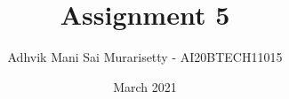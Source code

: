 \documentclass[journal,12pt,twocolumn]{IEEEtran}
\date{March 2021}
\DeclareMathOperator*{\Res}{Res}
\begin{document}
\newcommand{\BEQA}{\begin{eqnarray}}
\newcommand{\EEQA}{\end{eqnarray}}
\newcommand{\define}{\stackrel{\triangle}{=}}

\raggedbottom
\setlength{\parindent}{0pt}
\providecommand{\mbf}{\mathbf}
\providecommand{\pr}[1]{\ensuremath{\Pr\left(#1\right)}}
\providecommand{\qfunc}[1]{\ensuremath{Q\left(#1\right)}}
\providecommand{\fn}[1]{\ensuremath{f\left({#1}\right)}}
\providecommand{\e}[1]{\ensuremath{E\left(#1\right)}}
\providecommand{\sbrak}[1]{\ensuremath{{}\left[#1\right]}}
\providecommand{\lsbrak}[1]{\ensuremath{{}\left[#1\right.}}
\providecommand{\rsbrak}[1]{\ensuremath{{}\left.#1\right]}}
\providecommand{\brak}[1]{\ensuremath{\left(#1\right)}}
\providecommand{\lbrak}[1]{\ensuremath{\left(#1\right.}}
\providecommand{\rbrak}[1]{\ensuremath{\left.#1\right)}}
\providecommand{\cbrak}[1]{\ensuremath{\left\{#1\right\}}}
\providecommand{\lcbrak}[1]{\ensuremath{\left\{#1\right.}}
\providecommand{\rcbrak}[1]{\ensuremath{\left.#1\right\}}}
\theoremstyle{remark}
\newtheorem{rem}{Remark}
\newcommand{\sgn}{\mathop{\mathrm{sgn}}}
\newcommand{\comb}[2]{{}^{#1}\mathrm{C}_{#2}}
\newcommand{\p}[2]{P\left(X={#1} , Y={#2}\right)}
\newcommand{\q}[1]{P\left(X={#1}\right)}
\providecommand{\abs}[1]{\vert#1\vert}
\providecommand{\res}[1]{\Res\displaylimits_{#1}} 
\providecommand{\norm}[1]{\lVert#1\rVert}
\providecommand{\mtx}[1]{\mathbf{#1}}
\providecommand{\mean}[1]{E[ #1 ]}
\providecommand{\fourier}{\overset{\mathcal{F}}{ \rightleftharpoons}}
\providecommand{\system}{\overset{\mathcal{H}}{ \longleftrightarrow}}
\newcommand{\solution}{\noindent \textbf{Solution: }}
\newcommand{\cosec}{\,\text{cosec}\,}
\providecommand{\dec}[2]{\ensuremath{\overset{#1}{\underset{#2}{\gtrless}}}}
\newcommand{\myvec}[1]{\ensuremath{\begin{pmatrix}#1\end{pmatrix}}}
\newcommand{\mydet}[1]{\ensuremath{\begin{vmatrix}#1\end{vmatrix}}}
\makeatletter
\vspace{3cm}
\title{Assignment 5}
\author{Adhvik Mani Sai Murarisetty - AI20BTECH11015}
\maketitle
\newpage
\bigskip
\renewcommand{\thetable}{\theenumi}
\end{document}
